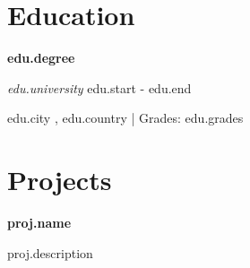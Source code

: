 \documentclass[10pt,a4paper]{article}
\newcommand{\VAR}[1]{ #1 }
\newcommand{\BLOCK}[1]{ }
\begin{document}
\begin{paracol}{2}
\begin{rightcolumn}
\section*{Education}
\BLOCK{for edu in education}
\textbf{\VAR{edu.degree}}\par
\textit{\VAR{edu.university}} \hfill \VAR{edu.start} - \VAR{edu.end}\par
\small \VAR{edu.city}, \VAR{edu.country} | Grades: \VAR{edu.grades}\par\vspace{10pt}
\BLOCK{endfor}

\BLOCK{if projects}
\section*{Projects}
\BLOCK{for proj in projects}
\textbf{\VAR{proj.name}}\par
\VAR{proj.description}\par\vspace{10pt}
\BLOCK{endfor}
\BLOCK{endif}

\end{rightcolumn}

\end{paracol}
\end{document}
